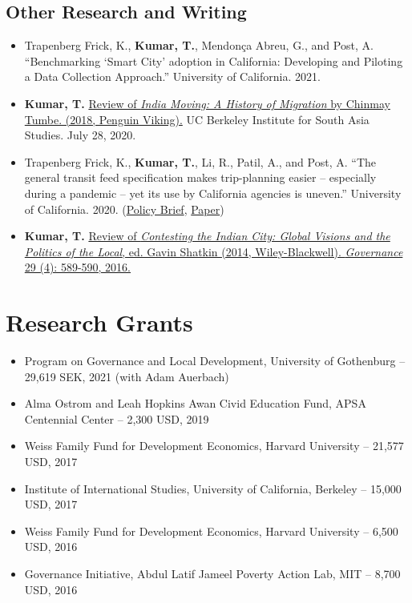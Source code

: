 \documentclass[11pt]{article}
\begin{document}
\subsection*{Other Research and Writing}	
\begin{itemize}
\item[]Trapenberg Frick, K., \textbf{Kumar, T.}, Mendon\c{c}a Abreu, G., and Post, A. ``Benchmarking `Smart City' adoption in California: Developing and Piloting a Data Collection Approach.'' University of California. 2021. 
\item[]\textbf{Kumar, T.} \href{https://southasia.berkeley.edu/sites/default/files/shared/India_Center/India_Moving.pdf}{Review of \textit{India Moving: A History of Migration} by Chinmay Tumbe. (2018, Penguin Viking).}  UC Berkeley Institute for South Asia Studies. July 28, 2020.
\item[]Trapenberg Frick, K., \textbf{Kumar, T.}, Li, R., Patil, A., and Post, A. ``The general transit feed specification makes trip-planning easier -- especially during a pandemic -- yet its use by California agencies is uneven.'' University of California. 2020. (\href{https://escholarship.org/uc/item/9j94q60f}{Policy Brief}, \href{https://escholarship.org/uc/item/1f29b7dk}{Paper}) 
\item[]\textbf{Kumar, T.} \href{http://onlinelibrary.wiley.com/doi/10.1111/gove.12241/abstract}{Review of \textit{Contesting the Indian City: Global Visions and the Politics of the Local}, ed. Gavin Shatkin (2014, Wiley-Blackwell). \textit{Governance} 29 (4): 589-590, 2016.} \

\end{itemize}
\vspace{2mm}
\section*{Research Grants}

\begin{itemize}[nosep]

\item[] Program on Governance and Local Development, University of Gothenburg -- 29,619 SEK, 2021 (with Adam Auerbach)
\item[] Alma Ostrom and Leah Hopkins Awan Civid Education Fund, APSA Centennial Center -- 2,300 USD, 2019

\item[] Weiss Family Fund for Development Economics, Harvard University -- 21,577 USD, 2017


	 
\item[]Institute of International Studies, University of California, Berkeley -- 15,000 USD, 2017
\item[] Weiss Family Fund for Development Economics, Harvard University -- 6,500 USD, 2016 

\item[] Governance Initiative, Abdul Latif Jameel Poverty Action Lab, MIT -- 8,700 USD, 2016	
\end{itemize}
\end{document}
